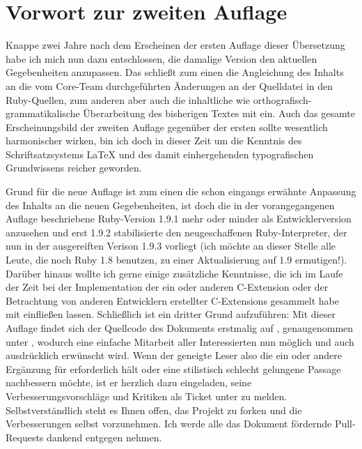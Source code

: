 \section*{Vorwort zur zweiten Auflage}
\label{sec:vorwort2}

Knappe zwei Jahre nach dem Erscheinen der ersten Auflage dieser
Übersetzung habe ich mich nun dazu entschlossen, die damalige Version
den aktuellen Gegebenheiten anzupassen. Das schließt zum einen die
Angleichung des Inhalts an die vom Core-Team durchgeführten Änderungen
an der Quelldatei  in den Ruby-Quellen, zum anderen
aber auch die inhaltliche wie orthografisch-grammatikalische
Überarbeitung des bisherigen Textes mit ein. Auch das gesamte
Erscheinungsbild der zweiten Auflage gegenüber der ersten sollte
wesentlich harmonischer wirken, bin ich doch in dieser Zeit um die
Kenntnis des Schriftsatzsystems \LaTeX{} und des damit einhergehenden
typografischen Grundwissens reicher geworden.

Grund für die neue Auflage ist zum einen die schon eingangs erwähnte
Anpassung des Inhalts an die neuen Gegebenheiten, ist doch die in der
vorangegangenen Auflage beschriebene Ruby-Version 1.9.1 mehr oder
minder als Entwicklerversion anzusehen und erst 1.9.2
stabilisierte den neugeschaffenen Ruby-Interpreter, der nun in der
ausgereiften Verison 1.9.3 vorliegt (ich möchte an dieser Stelle alle
Leute, die noch Ruby 1.8 benutzen, zu einer Aktualisierung auf 1.9
ermutigen!). Darüber hinaus wollte ich gerne einige zusätzliche
Kenntnisse, die ich im Laufe der Zeit bei der Implementation der ein
oder anderen C-Extension oder der Betrachtung von anderen Entwicklern
erstellter C-Extensions gesammelt habe mit einfließen
lassen. Schließlich ist ein dritter Grund aufzuführen: Mit dieser
Auflage findet sich der Quellcode des Dokuments erstmalig auf
, genaugenommen unter , wodurch
eine einfache Mitarbeit aller Interessierten nun möglich und auch
ausdrücklich erwünscht wird. Wenn der geneigte Leser also die ein oder
andere Ergänzung für erforderlich hält oder eine stilistisch schlecht
gelungene Passage nachbessern möchte, ist er herzlich dazu eingeladen,
seine Verbesserungsvorschläge und Kritiken als Ticket unter  zu melden. Selbstverständlich steht es Ihnen offen, das
Projekt zu forken und die Verbesserungen selbst vorzunehmen. Ich werde
alle das Dokument fördernde Pull-Requests dankend entgegen nehmen.

